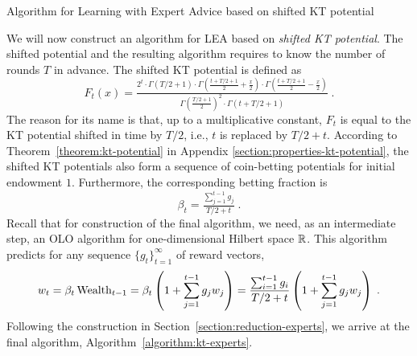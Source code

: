 \begin{algorithm}[t]
\begin{algorithmic}[1]
\caption{Algorithm for Learning with Expert Advice based on shifted KT potential
\label{algorithm:kt-experts}}
{
\ENDFOR
}
\end{algorithmic}
\end{algorithm}

We will now construct an algorithm for \ac{LEA} based on
\emph{shifted KT potential}. The shifted potential and the resulting algorithm
requires to know the number of rounds $T$ in advance. The shifted KT
potential is defined as
\[
F_t(x) = \tfrac{2^t \cdot \Gamma\left(T/2 + 1 \right) \cdot \Gamma\left(\tfrac{t+T/2+1}{2} + \frac{x}{2} \right) \cdot \Gamma\left(\tfrac{t+T/2+1}{2} - \frac{x}{2} \right)}{\Gamma\left(\tfrac{T/2+1}{2} \right)^2 \cdot \Gamma \left(t+T/2+1\right)} \; .
\]
The reason for its name is that, up to a multiplicative constant, $F_t$ is equal
to the KT potential shifted in time by $T/2$, i.e., $t$ is replaced by $T/2+t$.
According to Theorem~\ref{theorem:kt-potential} in Appendix
\ref{section:properties-kt-potential}, the shifted KT potentials also form
a sequence of coin-betting potentials for initial endowment $1$. Furthermore, the
corresponding betting fraction is
\[
\beta_t = \tfrac{\sum_{j=1}^{t-1} g_j}{T/2+t} \; .
\]
Recall that for construction of the final algorithm, we need, as an intermediate
step, an OLO algorithm for one-dimensional Hilbert space $\mathbb{R}$. This algorithm
predicts for any sequence $\{g_t\}_{t=1}^\infty$ of reward vectors,
\[
w_t
= \beta_t \operatorname{Wealth}_{t-1}
= \beta_t \left(1 + \sum_{j=1}^{t-1} g_j w_j \right)
= \frac{\sum_{i=1}^{t-1} g_i}{T/2+t} \left(1 + \sum_{j=1}^{t-1} g_j w_j \right) \; .
\]
Following the construction in Section~\ref{section:reduction-experts}, we arrive
at the final algorithm, Algorithm~\ref{algorithm:kt-experts}.

